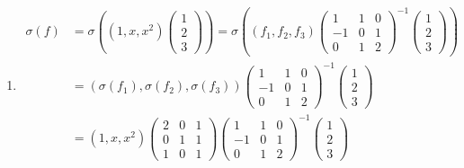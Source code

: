 \documentclass[UTF8,12pt,a4paper,fontset=fandol]{ctexart}
\begin{document}
\begin{solve}
\begin{enumerate}
                \item \begin{align*}
                          \sigma(f) & = \sigma\left((1, x, x^2)
                          \begin{pmatrix} 1 \\ 2 \\ 3 \end{pmatrix}\right)= \sigma\left((f_1, f_2, f_3)
                          \begin{pmatrix}
                              1  & 1 & 0 \\
                              -1 & 0 & 1 \\
                              0  & 1 & 2
                          \end{pmatrix}^{-1} \begin{pmatrix} 1 \\ 2 \\ 3 \end{pmatrix}\right) \\
                                    & = (\sigma(f_1), \sigma(f_2), \sigma(f_3))
                          \begin{pmatrix}
                              1  & 1 & 0 \\
                              -1 & 0 & 1 \\
                              0  & 1 & 2
                          \end{pmatrix}^{-1} \begin{pmatrix} 1 \\ 2 \\ 3 \end{pmatrix}        \\
                                    & = (1, x, x^2)
                          \begin{pmatrix}
                              2 & 0 & 1 \\
                              0 & 1 & 1 \\
                              1 & 0 & 1
                          \end{pmatrix}
                          \begin{pmatrix}
                              1  & 1 & 0 \\
                              -1 & 0 & 1 \\
                              0  & 1 & 2
                          \end{pmatrix}^{-1}
                          \begin{pmatrix} 1 \\ 2 \\ 3 \end{pmatrix}                           \\

\end{align*}
\end{enumerate}
\end{solve}
\end{document}
